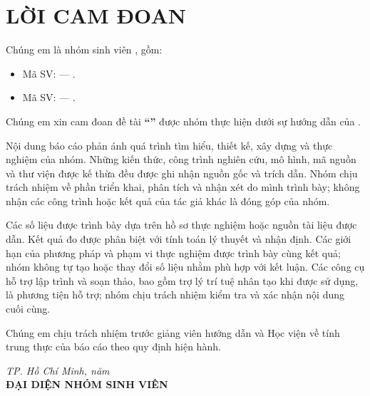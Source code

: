 \chapter*{LỜI CAM ĐOAN}

Chúng em là nhóm sinh viên \reportgroup, gồm:
\begin{itemize}
    \item Mã SV: \reportstudentoneid{} — \textbf{\reportstudentone}.
    \item Mã SV: \reportstudenttwoid{} — \textbf{\reportstudenttwo}.
\end{itemize}
Chúng em xin cam đoan đề tài \textbf{``\reporttitle''} được nhóm thực hiện dưới sự hướng dẫn của \textbf{\reportsupervisor}.

Nội dung báo cáo phản ánh quá trình tìm hiểu, thiết kế, xây dựng và thực nghiệm của nhóm. Những kiến thức, công trình nghiên cứu, mô hình, mã nguồn và thư viện được kế thừa đều được ghi nhận nguồn gốc và trích dẫn. Nhóm chịu trách nhiệm về phần triển khai, phân tích và nhận xét do mình trình bày; không nhận các công trình hoặc kết quả của tác giả khác là đóng góp của nhóm.

Các số liệu được trình bày dựa trên hồ sơ thực nghiệm hoặc nguồn tài liệu được dẫn. Kết quả đo được phân biệt với tính toán lý thuyết và nhận định. Các giới hạn của phương pháp và phạm vi thực nghiệm được trình bày cùng kết quả; nhóm không tự tạo hoặc thay đổi số liệu nhằm phù hợp với kết luận. Các công cụ hỗ trợ lập trình và soạn thảo, bao gồm trợ lý trí tuệ nhân tạo khi được sử dụng, là phương tiện hỗ trợ; nhóm chịu trách nhiệm kiểm tra và xác nhận nội dung cuối cùng.

Chúng em chịu trách nhiệm trước giảng viên hướng dẫn và Học viện về tính trung thực của báo cáo theo quy định hiện hành.

\vspace{0.7cm}
\begin{flushright}
\textit{TP. Hồ Chí Minh, năm \reportyear}\\[0.2cm]
\textbf{ĐẠI DIỆN NHÓM SINH VIÊN}\\[1.2cm]
\textbf{\reportrepresentative}
\end{flushright}
